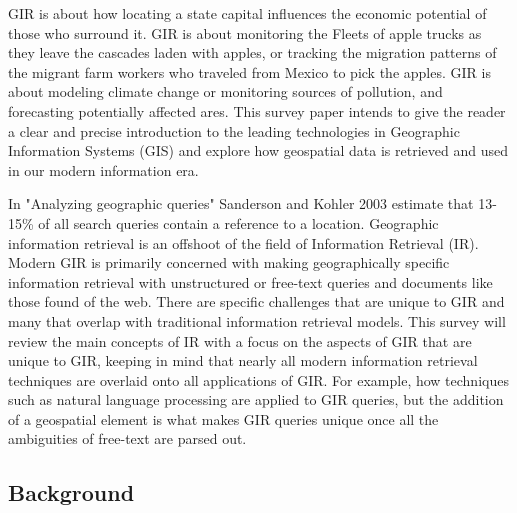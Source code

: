\documentclass[10pt, conference, compsocconf]{IEEEtran}
\begin{document}
GIR is about how locating a state capital influences the economic potential of those who surround it. GIR is about monitoring the Fleets of apple trucks as they leave the cascades laden with apples, or tracking the migration patterns of the migrant farm workers who traveled from Mexico to pick the apples. GIR is about modeling climate change or monitoring sources of pollution, and forecasting potentially affected ares. This survey paper intends to give the reader a clear and precise introduction to the leading technologies in Geographic Information Systems (GIS) and explore how geospatial data is retrieved and used in our modern information era. 

In "Analyzing geographic queries" Sanderson and Kohler 2003 \cite{Sanderson:tm} estimate that 13-15\% of all search queries contain a reference to a location. Geographic information retrieval is an offshoot of the field of Information Retrieval (IR). Modern GIR is primarily concerned with making geographically specific information retrieval with unstructured or free-text queries and documents like those found of the web. There are specific challenges that are unique to GIR and many that overlap with traditional information retrieval models. This survey will review the main concepts of IR with a focus on the aspects of GIR that are unique to GIR, keeping in mind that nearly all modern information retrieval techniques are overlaid onto all applications of GIR. For example, how techniques such as natural language processing are applied to GIR queries, but the addition of a geospatial element is what makes GIR queries unique once all the ambiguities of free-text are parsed out.

\subsection{Background}
\end{document}

